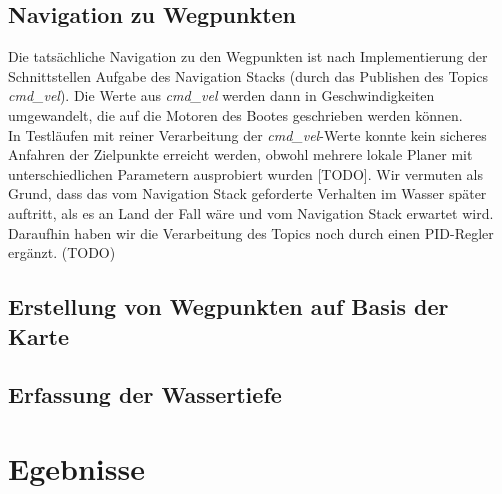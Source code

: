\documentclass[conference]{IEEEtran}
\begin{document}
\subsection{Navigation zu Wegpunkten}
Die tatsächliche Navigation zu den Wegpunkten ist nach Implementierung der Schnittstellen Aufgabe des Navigation Stacks (durch das Publishen des Topics \textit{cmd\_vel}). Die Werte aus \textit{cmd\_vel} werden dann in Geschwindigkeiten umgewandelt, die auf die Motoren des Bootes geschrieben werden können.\\
In Testläufen mit reiner Verarbeitung der \textit{cmd\_vel}-Werte konnte kein sicheres Anfahren der Zielpunkte erreicht werden, obwohl mehrere lokale Planer mit unterschiedlichen Parametern ausprobiert wurden [TODO]. Wir vermuten als Grund, dass das vom Navigation Stack geforderte Verhalten im Wasser später auftritt, als es an Land der Fall wäre und vom Navigation Stack erwartet wird. Daraufhin haben wir die Verarbeitung des Topics noch durch einen PID-Regler ergänzt. (TODO)
\subsection{Erstellung von Wegpunkten auf Basis der Karte}
\subsection{Erfassung der Wassertiefe}

\section{Egebnisse}
\end{document}

